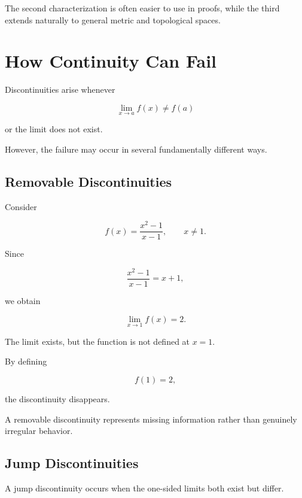 \documentclass{essay}
\begin{document}
The second characterization is often easier to use in proofs, while the third
extends naturally to general metric and topological spaces.


\section{How Continuity Can Fail}

Discontinuities arise whenever

\[ \lim_{x\to a}f(x)\neq f(a) \]

or the limit does not exist.

However, the failure may occur in several fundamentally different ways.


\subsection{Removable Discontinuities}

\begin{example}

  Consider

  \[ f(x)=\frac{x^{2}-1}{x-1}, \qquad x\neq1. \]

  Since

  \[ \frac{x^{2}-1}{x-1}=x+1, \]

  we obtain

  \[ \lim_{x\to1}f(x)=2. \]

  The limit exists, but the function is not defined at \(x=1\).

  By defining

  \[ f(1)=2, \]

  the discontinuity disappears.

\end{example}

A removable discontinuity represents missing information rather than genuinely
irregular behavior.


\subsection{Jump Discontinuities}

A jump discontinuity occurs when the one-sided limits both exist but differ.
\end{document}
